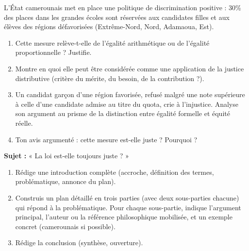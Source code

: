 \documentclass[11pt]{article}
\newcounter{popsec}
\newcounter{popsub}
\newcommand{\courssub}[1]{%
  \stepcounter{popsub}%
  \par\vspace{9pt}\noindent{\popxbold\fontsize{11.5}{13}\selectfont\color{popink}{\color{poporange}\thepopsec.\thepopsub}\hspace{6pt}#1}\par\nopagebreak\vspace{4pt}
}
\begin{document}
\begin{exercice}
L'État camerounais met en place une politique de discrimination positive : 30\% des places dans les grandes écoles sont réservées aux candidates filles et aux élèves des régions défavorisées (Extrême-Nord, Nord, Adamaoua, Est).
\begin{enumerate}
\item Cette mesure relève-t-elle de l'égalité arithmétique ou de l'égalité proportionnelle ? Justifie.
\item Montre en quoi elle peut être considérée comme une application de la justice distributive (critère du mérite, du besoin, de la contribution ?).
\item Un candidat garçon d'une région favorisée, refusé malgré une note supérieure à celle d'une candidate admise au titre du quota, crie à l'injustice. Analyse son argument au prisme de la distinction entre égalité formelle et équité réelle.
\item Ton avis argumenté : cette mesure est-elle juste ? Pourquoi ?
\end{enumerate}
\end{exercice}

\courssub{Je me prépare au Bac}

\begin{exercice}
\textbf{Sujet :} « La loi est-elle toujours juste ? »
\begin{enumerate}
\item Rédige une introduction complète (accroche, définition des termes, problématique, annonce du plan).
\item Construis un plan détaillé en trois parties (avec deux sous-parties chacune) qui répond à la problématique. Pour chaque sous-partie, indique l'argument principal, l'auteur ou la référence philosophique mobilisée, et un exemple concret (camerounais si possible).
\item Rédige la conclusion (synthèse, ouverture).
\end{enumerate}
\end{exercice}
\end{document}
